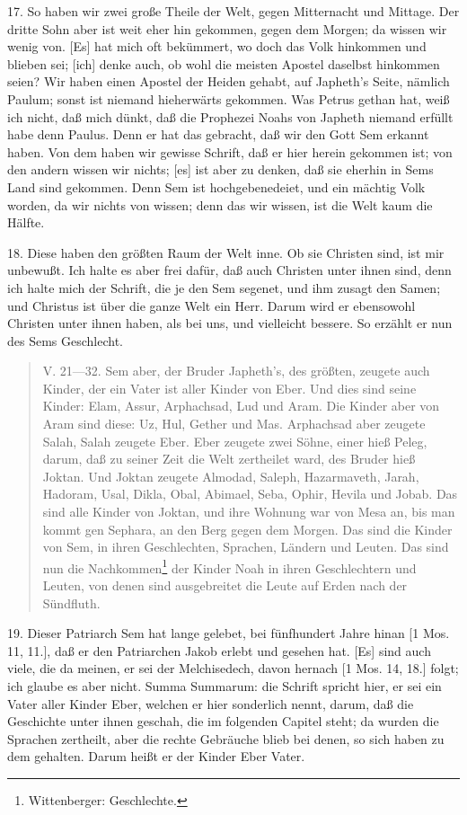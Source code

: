 17. So haben wir zwei große Theile der Welt, gegen Mitternacht und Mittage. Der
dritte Sohn aber ist weit eher hin gekommen, gegen dem Morgen; da wissen wir wenig von. [Es] hat mich oft bekümmert, wo doch das Volk hinkommen und blieben sei; [ich] denke auch, ob wohl die meisten Apostel daselbst hinkommen seien? Wir haben einen Apostel der Heiden gehabt, auf Japheth's Seite, nämlich Paulum; sonst ist niemand hieherwärts gekommen. Was Petrus gethan hat, weiß ich nicht, daß mich dünkt, daß die Prophezei Noahs von Japheth niemand erfüllt habe denn Paulus. Denn er hat das gebracht, daß wir den Gott Sem erkannt haben. Von dem haben wir gewisse Schrift, daß er hier herein gekommen ist; von den andern wissen wir nichts; [es] ist aber zu denken, daß sie eherhin in Sems Land sind gekommen. Denn Sem ist hochgebenedeiet, und ein mächtig Volk worden, da wir nichts von wissen; denn das wir wissen, ist die Welt kaum die Hälfte.

18. Diese haben den größten Raum der Welt inne. Ob sie Christen sind, ist mir unbewußt. Ich halte es aber frei dafür, daß auch Christen unter ihnen sind, denn ich halte mich der Schrift, die je den Sem segenet, und ihm zusagt den Samen; und Christus ist über die ganze Welt ein Herr. Darum wird er ebensowohl Christen unter ihnen haben, als bei uns, und vielleicht bessere. So erzählt er nun des Sems Geschlecht.

\begin{quote}
V. 21—32. Sem aber, der Bruder Japheth's, des größten, zeugete auch Kinder, der ein Vater ist aller Kinder von Eber. Und dies sind seine Kinder: Elam, Assur, Arphachsad, Lud und Aram. Die Kinder aber von Aram sind diese: Uz, Hul, Gether und Mas. Arphachsad aber zeugete Salah, Salah zeugete Eber. Eber zeugete zwei Söhne, einer hieß Peleg, darum, daß zu seiner Zeit die Welt zertheilet ward, des Bruder hieß Joktan. Und Joktan zeugete Almodad, Saleph, Hazarmaveth, Jarah, Hadoram, Usal, Dikla, Obal, Abimael, Seba, Ophir, Hevila und Jobab. Das sind alle Kinder von Joktan, und ihre Wohnung war von Mesa an, bis man kommt gen Sephara, an den Berg gegen dem Morgen. Das sind die Kinder von Sem, in ihren Geschlechten, Sprachen, Ländern und Leuten. Das sind nun die Nachkommen\footnote{Wittenberger: Geschlechte.} der Kinder Noah in ihren Geschlechtern und Leuten, von denen sind ausgebreitet die Leute auf Erden nach der Sündfluth.
\end{quote}

19. Dieser Patriarch Sem hat lange gelebet, bei fünfhundert Jahre hinan [1 Mos. 11, 11.], daß er den Patriarchen Jakob erlebt und gesehen hat. [Es] sind auch viele, die da meinen, er sei der Melchisedech, davon hernach [1 Mos. 14, 18.] folgt; ich glaube es aber nicht. Summa Summarum: die Schrift spricht hier, er sei ein Vater aller Kinder Eber, welchen er hier sonderlich nennt, darum, daß die Geschichte unter ihnen geschah, die im folgenden Capitel steht; da wurden die Sprachen zertheilt, aber die rechte Gebräuche blieb bei denen, so sich haben zu dem gehalten. Darum heißt er der Kinder Eber Vater.

